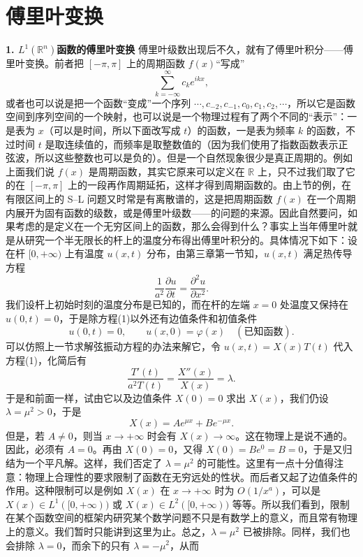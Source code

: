 \section{傅里叶变换}

\noindent\textbf{1. $L^1(\mathbb R^n)$函数的傅里叶变换}\quad
傅里叶级数出现后不久，就有了傅里叶积分——傅里叶变换。前者把 $[-\pi,\pi]$ 上的周期函数 $f(x)$“写成”
\[
 \sum_{k=-\infty}^{\infty}c_ke^{ikx},
\]
或者也可以说是把一个函数“变成”一个序列 $\cdots,c_{-2},c_{-1},c_0,c_1,c_2,\cdots$，所以它是函数空间到序列空间的一个映射，也可以说是一个物理过程有了两个不同的“表示”：一是表为 $x$（可以是时间，所以下面改写成 $t$）的函数，一是表为频率 $k$ 的函数，不过时间 $t$ 是取连续值的，而频率是取整数值的（因为我们使用了指数函数表示正弦波，所以这些整数也可以是负的）。但是一个自然现象很少是真正周期的。例如上面我们说 $f(x)$ 是周期函数，其实它原来可以定义在 $\mathbb R$ 上，只不过我们取了它的在 $[-\pi,\pi]$ 上的一段再作周期延拓，这样才得到周期函数的。由上节的例，在有限区间上的 S--L 问题又时常是有离散谱的，这是把周期函数 $f(x)$ 在一个周期内展开为固有函数的级数，或是傅里叶级数——的问题的来源。因此自然要问，如果考虑的是定义在一个无穷区间上的函数，那么会得到什么？事实上当年傅里叶就是从研究一个半无限长的杆上的温度分布得出傅里叶积分的。具体情况下如下：设在杆 $[0,+\infty)$ 上有温度 $u(x,t)$ 分布，由第三章第一节知，$u(x,t)$ 满足热传导方程
\begin{equation}
 \frac1{a^2}\frac{\partial u}{\partial t}=\frac{\partial^2u}{\partial x^2}.
 \tag{1}
\end{equation}
我们设杆上初始时刻的温度分布是已知的，而在杆的左端 $x=0$ 处温度又保持在 $u(0,t)=0$，于是除方程(1)以外还有边值条件和初值条件
\begin{equation}
 u(0,t)=0,\qquad u(x,0)=\varphi(x)\quad(\text{已知函数}).
 \tag{2}
\end{equation}
可以仿照上一节求解弦振动方程的办法来解它，令 $u(x,t)=X(x)T(t)$ 代入方程(1)，化简后有
\[
 \frac{T'(t)}{a^2T(t)}=\frac{X''(x)}{X(x)}=\lambda.
\]
于是和前面一样，试由它以及边值条件 $X(0)=0$ 求出 $X(x)$，我们仍设 $\lambda=\mu^2>0$，于是
\[
 X(x)=Ae^{\mu x}+Be^{-\mu x}.
\]
但是，若 $A\ne0$，则当 $x\to+\infty$ 时会有 $X(x)\to\infty$。这在物理上是说不通的。因此，必须有 $A=0$。再由 $X(0)=0$，又得 $X(0)=Be^0=B=0$，于是又归结为一个平凡解。这样，我们否定了 $\lambda=\mu^2$ 的可能性。这里有一点十分值得注意：物理上合理性的要求限制了函数在无穷远处的性状。而后者又起了边值条件的作用。这种限制可以是例如 $X(x)$ 在 $x\to+\infty$ 时为 $O(1/x^a)$，可以是 $X(x)\in L^1([0,+\infty))$ 或 $X(x)\in L^2([0,+\infty))$ 等等。所以我们看到，限制在某个函数空间的框架内研究某个数学问题不只是有数学上的意义，而且常有物理上的意义。我们暂时只能讲到这里为止。总之，$\lambda=\mu^2$ 已被排除。同样，我们也会排除 $\lambda=0$，而余下的只有 $\lambda=-\mu^2$，从而
